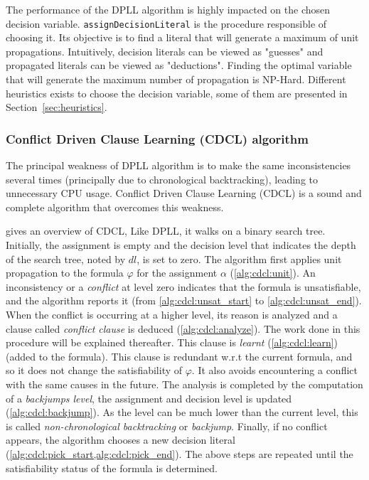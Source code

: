 The performance of the DPLL algorithm is highly impacted on the chosen decision variable.
\texttt{assignDecisionLiteral} is the procedure responsible of choosing it.
Its objective is to find a literal that will generate a maximum of unit propagations.
Intuitively, decision literals can be viewed as "guesses" and propagated literals can be viewed as "deductions". 
Finding the optimal variable that will generate the maximum number of propagation is NP-Hard\cite{biere2009handbook}.
Different heuristics exists to choose the decision variable, some of them are presented in Section~\ref{sec:heuristics}.

%
%
\subsubsection{Conflict Driven Clause Learning (CDCL) algorithm}\label{sec:cdcl}
The principal weakness of DPLL algorithm is to make the same inconsistencies several times
(principally due to chronological backtracking), leading to  unnecessary CPU usage.
Conflict Driven Clause Learning (CDCL) \cite{marques1999grasp} is a sound and complete algorithm
that overcomes this weakness.

 gives an overview of CDCL, Like DPLL,  it walks on a binary search tree.
Initially, the  assignment is empty and the decision level that 
indicates the depth of the search tree, noted by $dl$, is set to zero.
The algorithm first applies unit propagation to the formula $\varphi$ for the  assignment $\alpha$ (\cref{alg:cdcl:unit}).
An inconsistency or a \emph{conflict} at level zero indicates that the formula is unsatisfiable, and the algorithm
reports it (from \cref{alg:cdcl:unsat_start} to \cref{alg:cdcl:unsat_end}). When the conflict is occurring at a higher level,
 its reason is analyzed and a clause called \emph{conflict clause} is deduced (\cref{alg:cdcl:analyze}).
The work done in this procedure will be explained thereafter.
This clause is \emph{learnt} (\cref{alg:cdcl:learn}) (added to the formula). This clause is redundant w.r.t the current
formula, and so it does not change the satisfiability of $\varphi$. It also avoids encountering a conflict with the same
causes in the future. %
The analysis is completed by the computation of a \emph{backjumps level}, the assignment and decision level is updated (\cref{alg:cdcl:backjump}).
 As the level can be much lower than the current level, this is called \emph{non-chronological backtracking} or \textit{backjump}.
Finally, if no conflict appears, the algorithm chooses a new decision literal 
(\cref{alg:cdcl:pick_start,alg:cdcl:pick_end}).
The above steps are repeated until the satisfiability status of the formula is determined.

